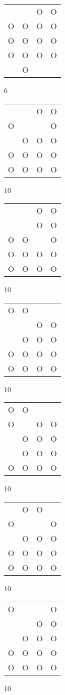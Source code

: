 \begin{tabular}{|m{0.2cm}m{0.2cm}m{0.2cm}m{0.2cm}|}\hline
 & &O&O\\
O&O&O&O\\
O&O&O&O\\
O&O&O&O\\
 &O& & \\
\hline\end{tabular}6
\begin{tabular}{|m{0.2cm}m{0.2cm}m{0.2cm}m{0.2cm}|}\hline
 & &O&O\\
O& & &O\\
 &O&O&O\\
O&O&O&O\\
O&O&O&O\\
\hline\end{tabular}10
\begin{tabular}{|m{0.2cm}m{0.2cm}m{0.2cm}m{0.2cm}|}\hline
 & &O&O\\
 & &O&O\\
O&O& &O\\
O&O&O&O\\
O&O&O&O\\
\hline\end{tabular}10
\begin{tabular}{|m{0.2cm}m{0.2cm}m{0.2cm}m{0.2cm}|}\hline
O&O& & \\
 & &O&O\\
 &O&O&O\\
O&O&O&O\\
O&O&O&O\\
\hline\end{tabular}10
\begin{tabular}{|m{0.2cm}m{0.2cm}m{0.2cm}m{0.2cm}|}\hline
O&O& & \\
O& &O&O\\
 &O&O&O\\
 &O&O&O\\
O&O&O&O\\
\hline\end{tabular}10
\begin{tabular}{|m{0.2cm}m{0.2cm}m{0.2cm}m{0.2cm}|}\hline
 &O&O& \\
O& & &O\\
 &O&O&O\\
O&O&O&O\\
O&O&O&O\\
\hline\end{tabular}10
\begin{tabular}{|m{0.2cm}m{0.2cm}m{0.2cm}m{0.2cm}|}\hline
O& & &O\\
 & &O&O\\
 &O&O&O\\
O&O&O&O\\
O&O&O&O\\
\hline\end{tabular}10
